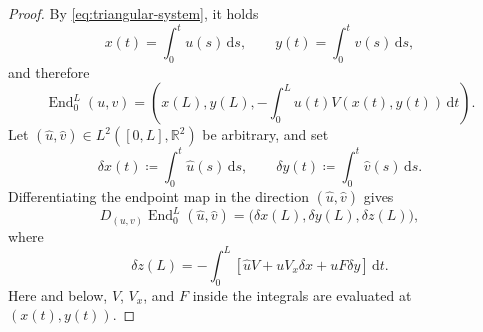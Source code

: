 \documentclass[11pt]{amsart}
\numberwithin{equation}{section}
\theoremstyle{remark}
\newcommand{\R}{\mathbb R}
\newcommand{\dd}{\,\mathrm d}
\newcommand{\End}{\operatorname{End}}
\begin{document}
\begin{proof}
By \eqref{eq:triangular-system}, it holds
\begin{equation}
 x(t)=\int_0^t u(s)\dd s,
 \qquad
 y(t)=\int_0^t v(s)\dd s,
\end{equation}
and therefore
\begin{equation}
 \End_0^L(u,v)
 =
 \left(
 x(L),y(L),
 -\int_0^L u(t)V(x(t),y(t))\dd t
 \right).
\end{equation}
Let $(\widehat u,\widehat v)\in L^2([0,L],\R^2)$ be arbitrary, and set
\begin{equation}
 \delta x(t)\coloneq \int_0^t\widehat u(s)\dd s,
 \qquad
 \delta y(t)\coloneq \int_0^t\widehat v(s)\dd s.
\end{equation}
Differentiating the endpoint map in the direction
$(\widehat u,\widehat v)$ gives
\begin{equation}
 D_{(u,v)}\End_0^L(\widehat u,\widehat v)
 =
 \bigl(\delta x(L),\delta y(L),\delta z(L)\bigr),
\end{equation}
where
\begin{equation}
 \delta z(L)
 =
 -\int_0^L
 \left[
 \widehat u V
 +uV_x \delta x
 +uF \delta y
 \right]\dd t.
\end{equation}
Here and below, $V$, $V_x$, and $F$ inside the integrals are evaluated at
$(x(t),y(t))$.


\end{proof}
\end{document}
